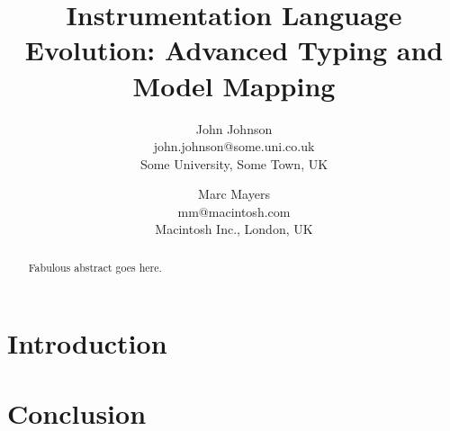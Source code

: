 \documentclass{gistt}
\title{Instrumentation Language Evolution: Advanced Typing and Model Mapping}
\author{John Johnson\\
john.johnson@some.uni.co.uk\\
Some University, Some Town, UK
\and
Marc Mayers\\
mm@macintosh.com\\
Macintosh Inc., London, UK}
\date{} %
\begin{document}
\maketitle

\begin{abstract}
Fabulous abstract goes here.
\end{abstract}

%
\section{Introduction}



%
\section{Conclusion}


\printbibliography
\end{document}
